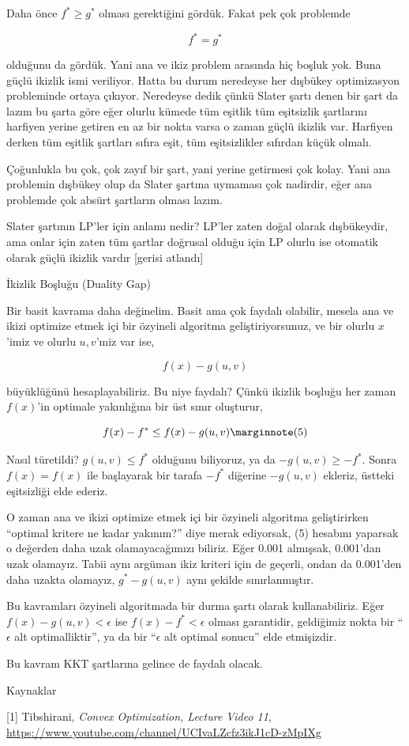 \documentclass[12pt,fleqn]{article}\usepackage{../../common}
\begin{document}
Daha önce $f^\ast \ge g^\ast$ olması gerektiğini gördük. Fakat pek çok problemde 

$$
f^\ast = g^\ast
$$

olduğunu da gördük. Yani ana ve ikiz problem arasında hiç boşluk yok. Buna
güçlü ikizlik ismi veriliyor. Hatta bu durum neredeyse her dışbükey
optimizasyon probleminde ortaya çıkıyor. Neredeyse dedik çünkü Slater şartı
denen bir şart da lazım bu şarta göre eğer olurlu kümede tüm eşitlik tüm
eşitsizlik şartlarını harfiyen yerine getiren en az bir nokta varsa o zaman
güçlü ikizlik var. Harfiyen derken tüm eşitlik şartları sıfıra eşit, tüm
eşitsizlikler sıfırdan küçük olmalı.

Çoğunlukla bu çok, çok zayıf bir şart, yani yerine getirmesi çok
kolay. Yani ana problemin dışbükey olup da Slater şartına uymaması çok
nadirdir, eğer ana problemde çok absürt şartların olması lazım. 

Slater şartının LP'ler için anlamı nedir? LP'ler zaten doğal olarak
dışbükeydir, ama onlar için zaten tüm şartlar doğrusal olduğu için LP
olurlu ise otomatik olarak güçlü ikizlik vardır [gerisi atlandı] 

İkizlik Boşluğu (Duality Gap)

Bir basit kavrama daha değinelim. Basit ama çok faydalı olabilir, mesela
ana ve ikizi optimize etmek içi bir özyineli algoritma geliştiriyorsunuz,
ve bir olurlu $x$'imiz ve olurlu $u,v$'miz var ise, 

$$
f(x) - g(u,v)
$$

büyüklüğünü hesaplayabiliriz. Bu niye faydalı? Çünkü ikizlik boşluğu her
zaman $f(x)$'in optimale yakınlığına bir üst sınır oluşturur, 

$$
f(x) - f^\ast \le f(x) - g(u,v) 
\mlabel{5}
$$

Nasıl türetildi? $g(u,v) \le f^\ast$ olduğunu biliyoruz, ya da
$-g(u,v) \ge -f^\ast$. Sonra $f(x)=f(x)$ ile başlayarak bir tarafa $-f^\ast$
diğerine $-g(u,v)$ ekleriz, üstteki eşitsizliği elde ederiz.

O zaman ana ve ikizi optimize etmek içi bir özyineli algoritma
geliştirirken ``optimal kritere ne kadar yakınım?'' diye merak ediyorsak,
(5) hesabını yaparsak o değerden daha uzak olamayacağımızı biliriz. Eğer
0.001 almışsak, 0.001'dan uzak olamayız. Tabii aynı argüman ikiz kriteri
için de geçerli, ondan da 0.001'den daha uzakta olamayız, $g^\ast-g(u,v)$ aynı
şekilde sınırlanmıştır.

Bu kavramları özyineli algoritmada bir durma şartı olarak kullanabiliriz.
Eğer $f(x) - g(u,v) < \epsilon$ ise $f(x) - f^\ast < \epsilon$ olması
garantidir, geldiğimiz nokta bir ``$\epsilon$ alt optimalliktir'', ya da
bir ``$\epsilon$ alt optimal sonucu'' elde etmişizdir.

Bu kavram KKT şartlarına gelince de faydalı olacak. 

Kaynaklar

[1] Tibshirani, {\em Convex Optimization, Lecture Video 11}, 
\url{https://www.youtube.com/channel/UCIvaLZcfz3ikJ1cD-zMpIXg}   
\end{document}
